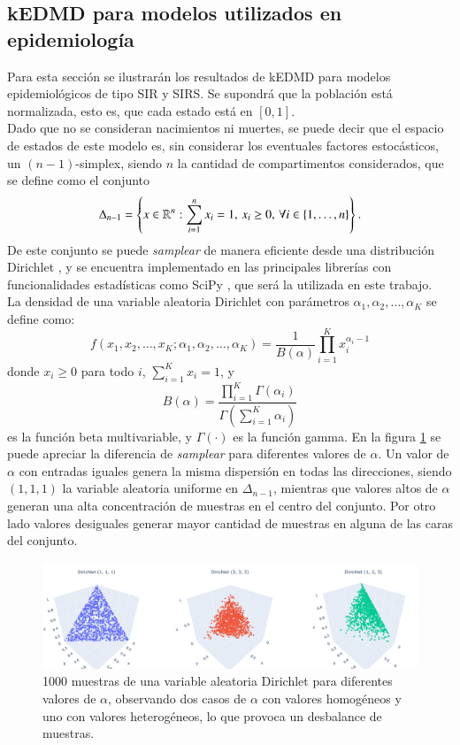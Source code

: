 \subsection{kEDMD para modelos utilizados en epidemiología}
Para esta sección se ilustrarán los resultados de kEDMD para modelos epidemiológicos de tipo SIR y SIRS. Se supondrá que la población está normalizada, esto es, que cada estado está en $[0, 1]$.\\
Dado que no se consideran nacimientos ni muertes, se puede decir que el espacio de estados de este modelo es, sin considerar los eventuales factores estocásticos, un $(n-1)$-simplex, siendo $n$ la cantidad de compartimentos considerados, que se define como el conjunto
\begin{equation*}
    \Delta_{n-1} = \left \{ x \in \mathbb{R}^n : \sum_{i=1}^n x_i = 1, \, x_i \geq 0, \, \forall i \in \{1, \dots, n\} \right \}.
\end{equation*}
De este conjunto se puede \textit{samplear} de manera eficiente desde una distribución Dirichlet \cite{Frigyik2010IntroductionProcesses}, y se encuentra implementado en las principales librerías con funcionalidades estadísticas como SciPy \cite{Virtanen2020SciPyPython}, que será la utilizada en este trabajo.\\
La densidad de una variable aleatoria Dirichlet con parámetros $\alpha_1, \alpha_2, \ldots, \alpha_K$ se define como:
\[
f(x_1, x_2, \ldots, x_K; \alpha_1, \alpha_2, \ldots, \alpha_K) = \frac{1}{B(\alpha)} \prod_{i=1}^{K} x_i^{\alpha_i - 1}
\]
donde $x_i \geq 0$ para todo $i$, $\sum_{i=1}^{K} x_i = 1$, y
\[
B(\alpha) = \frac{\prod_{i=1}^{K} \Gamma(\alpha_i)}{\Gamma\left(\sum_{i=1}^{K} \alpha_i\right)}
\]
es la función beta multivariable, y $\Gamma(\cdot)$ es la función gamma. En la figura \ref{fig:Dirichlet_samples} se puede apreciar la diferencia de \textit{samplear} para diferentes valores de $\alpha$. Un valor de $\alpha$ con entradas iguales genera la misma dispersión en todas las direcciones, siendo $(1, 1, 1)$ la variable aleatoria uniforme en $\Delta_{n-1}$, mientras que valores altos de $\alpha$ generan una alta concentración de muestras en el centro del conjunto. Por otro lado valores desiguales generar mayor cantidad de muestras en alguna de las caras del conjunto.
\begin{figure}[htbp]
    \centering
    \includegraphics[width=0.95\linewidth]{img/content/chapter3/Dirichlet.pdf}
    \caption{1000 muestras de una variable aleatoria Dirichlet para diferentes valores de $\alpha$, observando dos casos de $\alpha$ con valores homogéneos y uno con valores heterogéneos, lo que provoca un desbalance de muestras.}
    \label{fig:Dirichlet_samples}
\end{figure}

